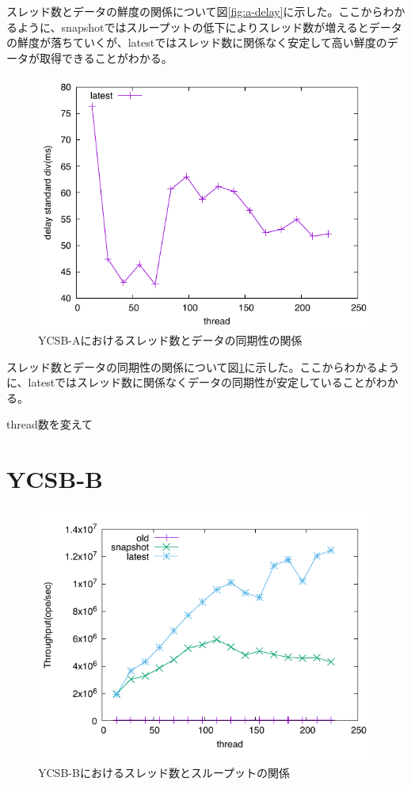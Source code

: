 \documentclass[a4paper]{jreport}	%
\begin{document}
スレッド数とデータの鮮度の関係について図\ref{fig:a-delay}に示した。ここからわかるように、snapshotではスループットの低下によりスレッド数が増えるとデータの鮮度が落ちていくが、latestではスレッド数に関係なく安定して高い鮮度のデータが取得できることがわかる。


\begin{figure}[h] 
\centering
\includegraphics[width=15cm]{ycsb-a/opposite-stddiv}
\caption{YCSB-Aにおけるスレッド数とデータの同期性の関係}
\label{fig:a-stddiv}
\end{figure}

スレッド数とデータの同期性の関係について図\ref{fig:a-stddiv}に示した。ここからわかるように、latestではスレッド数に関係なくデータの同期性が安定していることがわかる。

thread数を変えて

\section{YCSB-B}


\begin{figure}[h] 
\centering
\includegraphics[width=15cm]{ycsb-b/opposite-throughput}
\caption{YCSB-Bにおけるスレッド数とスループットの関係}
\label{fig:b-throughput}
\end{figure}
\end{document}
